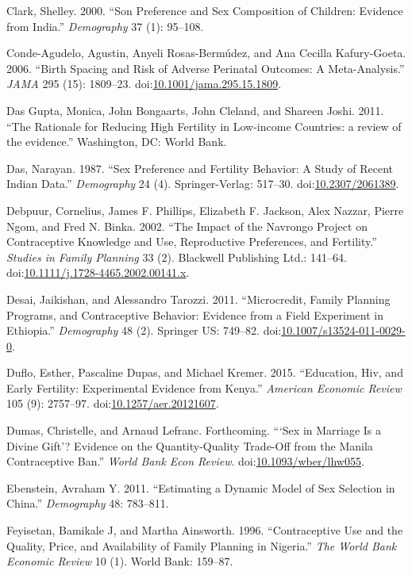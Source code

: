\documentclass[]{article}
\begin{document}
Clark, Shelley. 2000. ``Son Preference and Sex Composition of Children: Evidence from India.'' \emph{Demography} 37 (1): 95--108.

Conde-Agudelo, Agustin, Anyeli Rosas-Bermúdez, and Ana Cecilla Kafury-Goeta. 2006. ``Birth Spacing and Risk of Adverse Perinatal Outcomes: A Meta-Analysis.'' \emph{JAMA} 295 (15): 1809--23. doi:\href{https://doi.org/10.1001/jama.295.15.1809}{10.1001/jama.295.15.1809}.

Das Gupta, Monica, John Bongaarts, John Cleland, and Shareen Joshi. 2011. ``The Rationale for Reducing High Fertility in Low-income Countries: a review of the evidence.'' Washington, DC: World Bank.

Das, Narayan. 1987. ``Sex Preference and Fertility Behavior: A Study of Recent Indian Data.'' \emph{Demography} 24 (4). Springer-Verlag: 517--30. doi:\href{https://doi.org/10.2307/2061389}{10.2307/2061389}.

Debpuur, Cornelius, James F. Phillips, Elizabeth F. Jackson, Alex Nazzar, Pierre Ngom, and Fred N. Binka. 2002. ``The Impact of the Navrongo Project on Contraceptive Knowledge and Use, Reproductive Preferences, and Fertility.'' \emph{Studies in Family Planning} 33 (2). Blackwell Publishing Ltd.: 141--64. doi:\href{https://doi.org/10.1111/j.1728-4465.2002.00141.x}{10.1111/j.1728-4465.2002.00141.x}.

Desai, Jaikishan, and Alessandro Tarozzi. 2011. ``Microcredit, Family Planning Programs, and Contraceptive Behavior: Evidence from a Field Experiment in Ethiopia.'' \emph{Demography} 48 (2). Springer US: 749--82. doi:\href{https://doi.org/10.1007/s13524-011-0029-0}{10.1007/s13524-011-0029-0}.

Duflo, Esther, Pascaline Dupas, and Michael Kremer. 2015. ``Education, Hiv, and Early Fertility: Experimental Evidence from Kenya.'' \emph{American Economic Review} 105 (9): 2757--97. doi:\href{https://doi.org/10.1257/aer.20121607}{10.1257/aer.20121607}.

Dumas, Christelle, and Arnaud Lefranc. Forthcoming. ```Sex in Marriage Is a Divine Gift'? Evidence on the Quantity-Quality Trade-Off from the Manila Contraceptive Ban.'' \emph{World Bank Econ Review}. doi:\href{https://doi.org/10.1093/wber/lhw055}{10.1093/wber/lhw055}.

Ebenstein, Avraham Y. 2011. ``Estimating a Dynamic Model of Sex Selection in China.'' \emph{Demography} 48: 783--811.

Feyisetan, Bamikale J, and Martha Ainsworth. 1996. ``Contraceptive Use and the Quality, Price, and Availability of Family Planning in Nigeria.'' \emph{The World Bank Economic Review} 10 (1). World Bank: 159--87.
\end{document}
